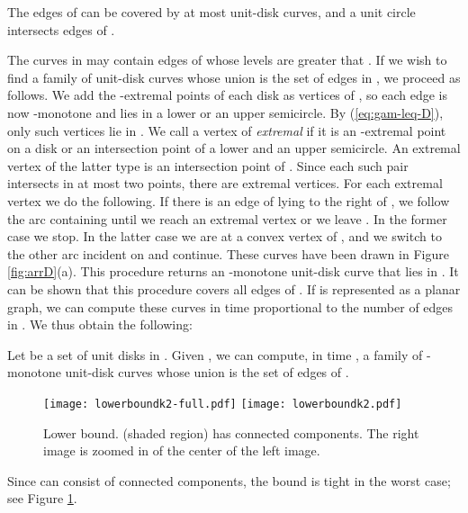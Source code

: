 \documentclass[11pt]{myclass}
\begin{document}
\begin{lemma}
The edges of  can be covered by at most  unit-disk curves, and a unit circle intersects  edges of .  
\label{lem:k-udc}
\end{lemma}


The curves in  may contain edges of  whose levels are greater that .  If we wish to find a family of unit-disk curves whose union is the set of edges in , we proceed as follows.  
We add the -extremal points of each disk as vertices of , so each edge is now -monotone and lies in a lower or an upper semicircle.  By (\ref{eq:gam-leq-D}), only  such vertices lie in .  
We call a vertex of  \emph{extremal} if it is an -extremal point on a disk or an intersection point of a lower and an upper semicircle.  An extremal vertex of the latter type is an intersection point of .  Since each such pair intersects in at most two points, there are  extremal vertices.  
For each extremal vertex  we do the following.  If there is an edge  of  lying to the right of , we follow the arc containing  until we reach an extremal vertex or we leave .  In the former case we stop.  In the latter 
case we are at a convex vertex  of , and we switch to the other arc incident on  and continue.  These curves have been drawn in Figure \ref{fig:arrD}(a).  This procedure returns an -monotone unit-disk curve that lies in .  It can be shown that this procedure covers all edges of .  
If  is represented as a planar graph, we can compute these curves in time proportional to the number of edges in .  
We thus obtain the following:

\begin{lemma}
Let  be a set of  unit disks in .  Given , we can compute, in time , a family of  -monotone unit-disk curves whose union is the set of edges of .  
\label{lem:udcs-k2}
\end{lemma}


\begin{figure}
  \centering 
  \texttt{[image: lowerboundk2-full.pdf]}
  \hspace{.5in}
  \texttt{[image: lowerboundk2.pdf]}
\caption{\label{fig:lb-k2} 
Lower bound.   (shaded region) has  connected components.  The right image is zoomed in of the center of the left image.}
\end{figure}

\begin{remark}
Since  can consist of  connected components, the  bound is tight in the worst case; see Figure \ref{fig:lb-k2}.
\end{remark}
\end{document}
